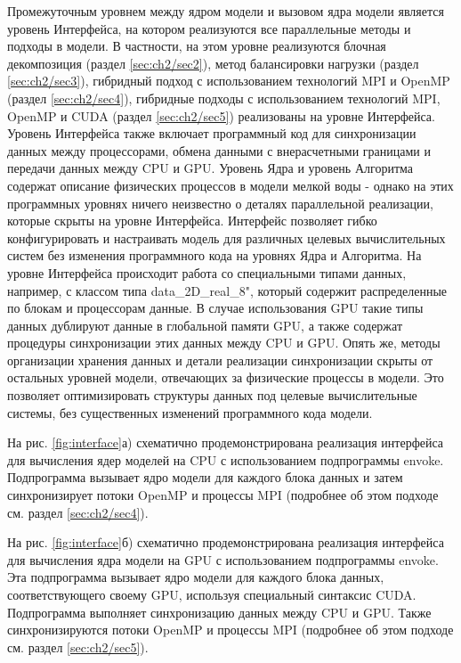Промежуточным уровнем между ядром модели и вызовом ядра модели является уровень Интерфейса, на котором реализуются все параллельные методы и подходы в модели.
В частности, на этом уровне реализуются блочная декомпозиция (раздел \ref{sec:ch2/sec2}), метод балансировки нагрузки (раздел \ref{sec:ch2/sec3}), гибридный подход с использованием технологий MPI и OpenMP (раздел \ref{sec:ch2/sec4}), гибридные подходы с использованием технологий MPI, OpenMP и CUDA (раздел \ref{sec:ch2/sec5}) реализованы на уровне Интерфейса.
Уровень Интерфейса также включает программный код для синхронизации данных между процессорами, обмена данными с внерасчетными границами и передачи данных между CPU и GPU. Уровень Ядра и уровень Алгоритма содержат описание физических процессов в модели мелкой воды - однако на этих программных уровнях ничего неизвестно о деталях параллельной реализации, которые скрыты на уровне Интерфейса. Интерфейс позволяет гибко конфигурировать и настраивать модель для различных целевых вычислительных систем без изменения программного кода на уровнях Ядра и Алгоритма.
На уровне Интерфейса происходит работа со специальными типами данных, например, с классом типа data\_2D\_real\_8", который содержит распределенные по блокам и процессорам данные. В случае использования GPU такие типы данных дублируют данные в глобальной памяти GPU, а также содержат процедуры синхронизации этих данных между CPU и GPU.
Опять же, методы организации хранения данных и детали реализации синхронизации скрыты от остальных уровней модели, отвечающих за физические процессы в модели. Это позволяет оптимизировать структуры данных под целевые вычислительные системы, без существенных изменений программного кода модели.

На рис. \ref{fig:interface}а) схематично продемонстрирована реализация интерфейса для вычисления ядер моделей на CPU с использованием подпрограммы envoke. 
Подпрограмма вызывает ядро модели для каждого блока данных и затем синхронизирует потоки OpenMP и процессы MPI (подробнее об этом подходе см. раздел \ref{sec:ch2/sec4}).

На рис. \ref{fig:interface}б) схематично продемонстрирована реализация интерфейса для вычисления ядра модели на GPU с использованием подпрограммы envoke.
Эта подпрограмма вызывает ядро модели для каждого блока данных, соответствующего своему GPU, используя специальный синтаксис CUDA.
Подпрограмма выполняет синхронизацию данных между CPU и GPU. Также синхронизируются потоки OpenMP и процессы MPI (подробнее об этом подходе см. раздел \ref{sec:ch2/sec5}).


